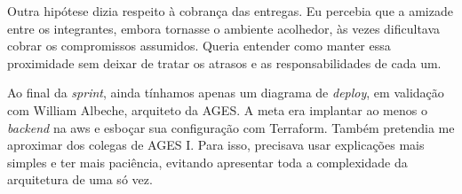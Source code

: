 Outra hipótese dizia respeito à cobrança das entregas. Eu percebia que a
amizade entre os integrantes, embora tornasse o ambiente acolhedor, às vezes
dificultava cobrar os compromissos assumidos. Queria entender como manter essa
proximidade sem deixar de tratar os atrasos e as responsabilidades de cada um.

Ao final da \textit{sprint}, ainda tínhamos apenas um diagrama de
\textit{deploy}, em validação com William Albeche, arquiteto da AGES. A meta
era implantar ao menos o \textit{backend} na \ac{aws} e esboçar sua configuração
com Terraform.
Também pretendia me aproximar dos colegas de AGES I. Para isso, precisava usar
explicações mais simples e ter mais paciência, evitando apresentar toda a
complexidade da arquitetura de uma só vez.
